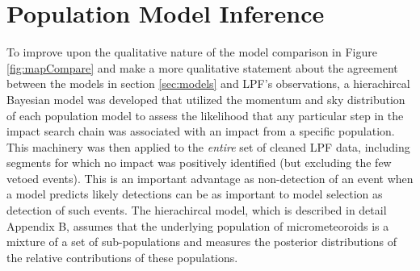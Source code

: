 \documentclass[twocolumn, trackchanges]{aastex62}
\begin{document}
\section{Population Model Inference} \label{sec:model_inference}
To improve upon the qualitative nature of the model comparison in Figure \ref{fig:mapCompare} and make a more qualitative statement about the agreement between the models in section \ref{sec:models} and LPF's observations, a hierachircal Bayesian model was developed that utilized the momentum and sky distribution of each population model to assess the likelihood that any particular step in the impact search chain was associated with an impact from a specific population.  This machinery was then applied to the \emph{entire} set of cleaned LPF data, including segments for which no impact was positively identified (but excluding the few vetoed events). This is an important advantage as non-detection of an event when a model predicts likely detections can be as important to model selection as detection of such events. The hierachircal model, which is described in detail Appendix B, assumes that the underlying population of micrometeoroids is a mixture of a set of sub-populations and measures the posterior distributions of the relative contributions of these populations.  
\end{document}
